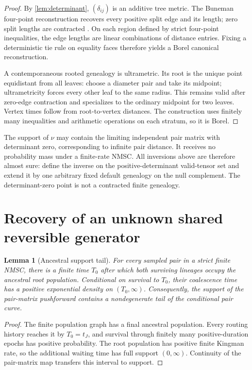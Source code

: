 \documentclass[11pt]{article}
\newtheorem{lemma}[theorem]{Lemma}
\begin{document}
\begin{proof}
By \cref{lem:determinant}, $(\delta_{ij})$ is an additive tree metric.  The Buneman four-point reconstruction recovers every positive split edge and its length; zero split lengths are contracted \citep{Buneman1971,SempleSteel2003}.  On each region defined by strict four-point inequalities, the edge lengths are linear combinations of distance entries.  Fixing a deterministic tie rule on equality faces therefore yields a Borel canonical reconstruction.

A contemporaneous rooted genealogy is ultrametric.  Its root is the unique point equidistant from all leaves: choose a diameter pair and take its midpoint; ultrametricity forces every other leaf to the same radius.  This remains valid after zero-edge contraction and specializes to the ordinary midpoint for two leaves.  Vertex times follow from root-to-vertex distances.  The construction uses finitely many inequalities and arithmetic operations on each stratum, so it is Borel.
\end{proof}

The support of $\nu$ may contain the limiting independent pair matrix with determinant zero, corresponding to infinite pair distance.  It receives no probability mass under a finite-rate NMSC.  All inversions above are therefore almost sure: define the inverse on the positive-determinant valid-tensor set and extend it by one arbitrary fixed default genealogy on the null complement.  The determinant-zero point is not a contracted finite genealogy.

\section{Recovery of an unknown shared reversible generator}
\label{sec:generator}

\begin{lemma}[Ancestral support tail]
\label{lem:tail}
For every sampled pair in a strict finite NMSC, there is a finite time $T_0$ after which both surviving lineages occupy the ancestral root population.  Conditional on survival to $T_0$, their coalescence time has a positive exponential density on $(T_0,\infty)$.  Consequently, the support of the pair-matrix pushforward contains a nondegenerate tail of the conditional pair curve.
\end{lemma}

\begin{proof}
The finite population graph has a final ancestral population.  Every routing history reaches it by $T_0=t_J$, and survival through finitely many positive-duration epochs has positive probability.  The root population has positive finite Kingman rate, so the additional waiting time has full support $(0,\infty)$.  Continuity of the pair-matrix map transfers this interval to support.
\end{proof}
\end{document}
